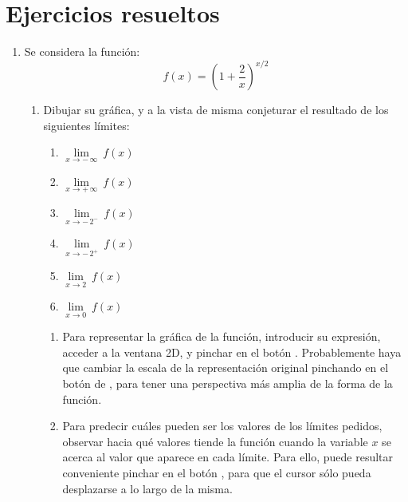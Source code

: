 \section{Ejercicios resueltos}
\begin{enumerate}[leftmargin=*]
\item  Se considera la función:
\[
f(x)=\left( 1+\frac 2x\right) ^{x/2}
\]

\begin{enumerate}
\item  Dibujar su gráfica, y a la vista de misma conjeturar el resultado
de los siguientes límites:
\begin{multicols}{2}
\begin{enumerate}
\item  $\lim\limits_{x\rightarrow -\,\infty }\ f(x)$

\item  $\lim\limits_{x\rightarrow +\,\infty }\ f(x)$

\item  $\lim\limits_{x\rightarrow -\,2^{-}}\ f(x)$

\item  $\lim\limits_{x\rightarrow -\,2^{+}}\ f(x)$

\item  $\lim\limits_{x\rightarrow 2}\ f(x)$

\item  $\lim\limits_{x\rightarrow 0}\ f(x)$

\end{enumerate}
\end{multicols}

\begin{indicacion}
{
\begin{enumerate}

\item Para representar la gráfica de la función, introducir su
expresión, acceder a la ventana 2D, y pinchar en el botón
. Probablemente haya que cambiar la
escala de la representación original pinchando en el botón de
, para tener una perspectiva
más amplia de la forma de la función.

\item Para predecir cuáles pueden ser los valores de los límites
pedidos, observar hacia qué valores tiende la función cuando la
variable $x$ se acerca al valor que aparece en cada límite. Para
ello, puede resultar conveniente pinchar en el botón , para que el cursor sólo pueda desplazarse a lo largo de
la misma.



\end{enumerate}}
\end{indicacion}
\end{enumerate}
\end{enumerate}
